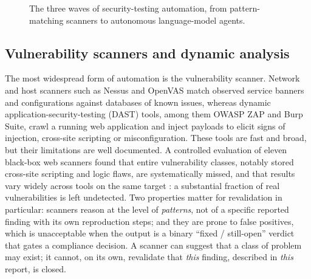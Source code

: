\begin{figure}[htbp]
\centering
{}
\caption[The three waves of security-testing automation]{The three waves of security-testing automation, from pattern-matching scanners to autonomous language-model agents.}
\label{fig:waves}
\end{figure}

\subsection{Vulnerability scanners and dynamic analysis}
\label{subsec:scanners}

The most widespread form of automation is the vulnerability scanner. Network and
host scanners such as Nessus and OpenVAS match
observed service banners and configurations against databases of known issues,
whereas dynamic application-security-testing (DAST) tools, among them OWASP
ZAP and Burp Suite, crawl a running web application
and inject payloads to elicit signs of injection, cross-site scripting or
misconfiguration. These tools are fast and
broad, but their limitations are well documented. A controlled evaluation of
eleven black-box web scanners found that entire vulnerability classes, notably
stored cross-site scripting and logic flaws, are systematically missed, and
that results vary widely across tools on the same target \cite{doupe2010}: a
substantial fraction of real vulnerabilities is left undetected. Two properties matter for revalidation in particular:
scanners reason at the level of \emph{patterns}, not of a specific reported
finding with its own reproduction steps; and they are prone to false positives,
which is unacceptable when the output is a binary ``fixed / still-open'' verdict
that gates a compliance decision. A scanner can suggest that a class of problem
may exist; it cannot, on its own, revalidate that \emph{this} finding, described
in \emph{this} report, is closed.

